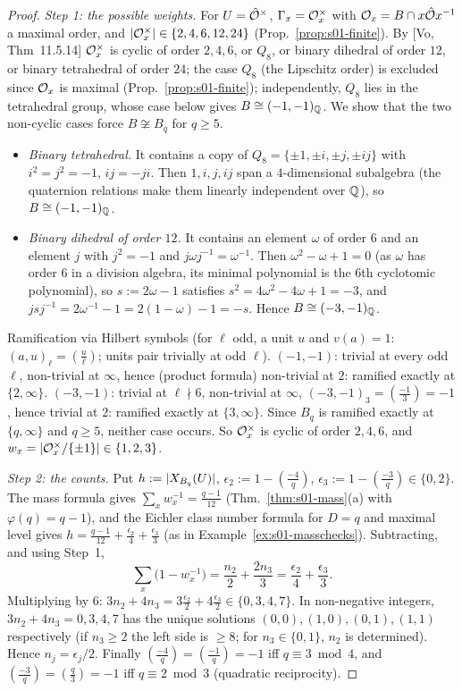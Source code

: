 \begin{proof}
\emph{Step 1: the possible weights.} For $U=\hat{\mathcal{O}}^\times$, $\Gamma_x=\mathcal{O}_x^\times$ with $\mathcal{O}_x=B\cap x\hat{\mathcal{O}} x^{-1}$ a maximal order, and
$|\mathcal{O}_x^\times|\in\{2,4,6,12,24\}$ (Prop.~\ref{prop:s01-finite}). By [Vo, Thm~11.5.14] $\mathcal{O}_x^\times$ is cyclic of order $2,4,6$, or $Q_8$, or binary
dihedral of order $12$, or binary tetrahedral of order $24$; the case $Q_8$ (the Lipschitz order) is excluded since $\mathcal{O}_x$ is maximal
(Prop.~\ref{prop:s01-finite}); independently, $Q_8$ lies in the tetrahedral group, whose case below gives $B\cong(-1,-1)_{\mathbb{Q}}$. We show that the two non-cyclic cases force $B\not\cong B_q$ for $q\ge5$.
\begin{itemize}
\item \emph{Binary tetrahedral.} It contains a copy of $Q_8=\{\pm1,\pm i,\pm j,\pm ij\}$ with $i^2=j^2=-1$, $ij=-ji$. Then $1,i,j,ij$ span a
  $4$-dimensional subalgebra (the quaternion relations make them linearly independent over $\mathbb{Q}$), so $B\cong(-1,-1)_{\mathbb{Q}}$.
\item \emph{Binary dihedral of order $12$.} It contains an element $\omega$ of order $6$ and an element $j$ with $j^2=-1$ and
  $j\omega j^{-1}=\omega^{-1}$. Then $\omega^2-\omega+1=0$ (as $\omega$ has order $6$ in a division algebra, its minimal polynomial is the
  $6$th cyclotomic polynomial), so $s:=2\omega-1$ satisfies $s^2=4\omega^2-4\omega+1=-3$, and $jsj^{-1}=2\omega^{-1}-1=2(1-\omega)-1=-s$. Hence
  $B\cong(-3,-1)_{\mathbb{Q}}$.
\end{itemize}
Ramification via Hilbert symbols (for $\ell$ odd, a unit $u$ and $v(a)=1$: $(a,u)_\ell=(\tfrac u\ell)$; units pair trivially at odd $\ell$).
$(-1,-1)$: trivial at every odd $\ell$, non-trivial at $\infty$, hence (product formula) non-trivial at $2$: ramified exactly at
$\{2,\infty\}$. $(-3,-1)$: trivial at $\ell\nmid6$, non-trivial at $\infty$, $(-3,-1)_3=(\tfrac{-1}3)=-1$, hence trivial at $2$:
ramified exactly at $\{3,\infty\}$. Since $B_q$ is ramified exactly at $\{q,\infty\}$ and $q\ge5$, neither case occurs. So $\mathcal{O}_x^\times$ is cyclic of
order $2,4,6$, and $w_x=|\mathcal{O}_x^\times/\{\pm1\}|\in\{1,2,3\}$.

\emph{Step 2: the counts.} Put $h:=|X_{B_q}(U)|$, $\epsilon_2:=1-(\tfrac{-4}q)$, $\epsilon_3:=1-(\tfrac{-3}q)\in\{0,2\}$. The mass formula gives
$\sum_xw_x^{-1}=\frac{q-1}{12}$ (Thm.~\ref{thm:s01-mass}(a) with $\varphi(q)=q-1$), and the Eichler class number formula for $D=q$ and maximal
level gives $h=\frac{q-1}{12}+\frac{\epsilon_2}4+\frac{\epsilon_3}3$ (as in Example~\ref{ex:s01-masschecks}). Subtracting, and using Step~1,
\[\sum_x\big(1-w_x^{-1}\big)=\frac{n_2}2+\frac{2n_3}3=\frac{\epsilon_2}4+\frac{\epsilon_3}3 .\]
Multiplying by $6$: $3n_2+4n_3=3\frac{\epsilon_2}2+4\frac{\epsilon_3}2\in\{0,3,4,7\}$. In non-negative integers, $3n_2+4n_3=0,3,4,7$ has the unique
solutions $(0,0),(1,0),(0,1),(1,1)$ respectively (if $n_3\ge2$ the left side is $\ge8$; for $n_3\in\{0,1\}$, $n_2$ is determined). Hence
$n_j=\epsilon_j/2$. Finally $(\tfrac{-4}q)=(\tfrac{-1}q)=-1$ iff $q\equiv3\bmod4$, and $(\tfrac{-3}q)=(\tfrac q3)=-1$ iff $q\equiv2\bmod3$ (quadratic
reciprocity).
\end{proof}


